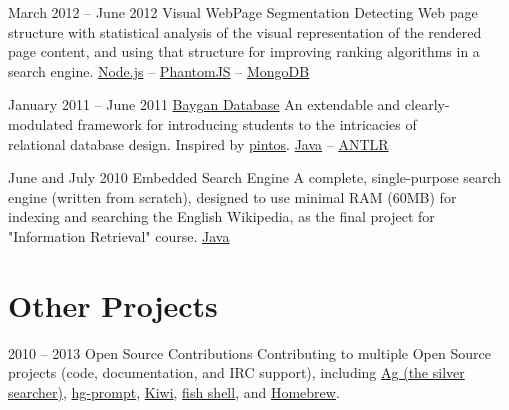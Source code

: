 \documentclass{tccv}
\begin{document}
{{\begin{project_list}
\item{March 2012 -- June 2012}
     {}
     {Visual WebPage Segmentation}
	 {Detecting Web page structure with statistical \mbox{analysis} of the visual representation of the rendered page content, and using that structure for improving ranking algorithms in a search engine.%
}
	 {%
	 	\href{http://nodejs.org}{Node.js} -- 
		\href{http://phantomjs.org}{PhantomJS} -- 
		\href{http://www.mongodb.org}{MongoDB}%
	 }

\vspace{-12pt}

\item{January 2011 -- June 2011}
	 {}
	 {\href{https://github.com/baygan/Baygan}{Baygan Database}}
	 {An extendable and clearly-modulated framework for introducing students to the intricacies of \\relational database design. Inspired by \href{http://www.stanford.edu/class/cs140/projects/pintos/pintos.html}{pintos}.%
}
	 {%
	 	\href{http://www.oracle.com/technetwork/java/}{Java} -- 
		\href{http://www.antlr.org}{ANTLR}%
	 }

\vspace{-15pt}
	 
\item{June and July 2010}
	 {}
	 {Embedded Search Engine}
	 {A complete, single-purpose search engine (\mbox{written} from scratch), designed to use minimal RAM (60MB) for indexing and searching the English Wikipedia, as the final project for "\mbox{Information} Retrieval" course.}
	 {%
		 \href{http://www.oracle.com/technetwork/java/}{Java}%
	 }

\end{project_list}



\vspace{-10pt}



\section{Other Projects}

\begin{project_list}
	 
\item{2010 -- 2013}
	 {}
	 {Open Source Contributions}
	 {Contributing to multiple Open Source projects (code, documentation, and IRC support), \mbox{including}
	 \href{https://github.com/ggreer/the_silver_searcher}{Ag (the silver searcher)}, 
	 \href{http://bitbucket.org/sjl/hg-prompt/}{hg-prompt}, \href{https://github.com/allending/Kiwi}{Kiwi}, 
	 \href{http://fishshell.com}{fish shell}, and 
	 \href{https://github.com/mxcl/homebrew}{Homebrew}.}
	 {}
	 

\end{project_list}}}
\end{document}
